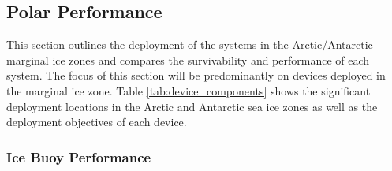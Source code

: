 \subsection{Polar Performance}

This section outlines the deployment of the systems in the Arctic/Antarctic marginal ice zones and compares the survivability and performance of each system. The focus of this section will be predominantly on devices deployed in the marginal ice zone. Table \ref{tab:device_components} shows the significant deployment locations in the Arctic and Antarctic sea ice zones as well as the deployment objectives of each device.

\subsubsection{Ice Buoy Performance}

